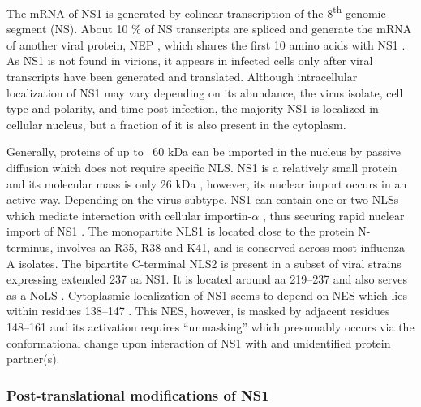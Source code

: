 		The mRNA of \gls{NS1} is generated by colinear transcription of the 8\textsuperscript{th} genomic segment (NS). About 10 \% of NS transcripts are spliced and generate the mRNA of another viral protein, \gls{NEP} \parencite{Lamb1980}, which shares the first 10 amino acids with \gls{NS1} \parencite{Inglis1979, Lamb1979, Lamb1980}. As \gls{NS1} is not found in virions, it appears in infected cells only after viral transcripts have been generated and translated. Although intracellular localization of \gls{NS1} may vary depending on its abundance, the virus isolate, cell type and polarity, and time post infection, the majority \gls{NS1} is localized in cellular nucleus, but a fraction of it is also present in the cytoplasm\parencite{Melen2007, Melen2012, Newby2007, Li1998, Greenspan1988}. 
		
		Generally, proteins of up to ~60 kDa can be imported in the nucleus by passive diffusion \parencite{Macara2001, Wang2007} which does not require specific \gls{NLS}. \gls{NS1} is a relatively small protein and its molecular mass is only 26 kDa \parencite{Ward1994}, however, its nuclear import occurs in an active way. Depending on the virus subtype, \gls{NS1} can contain one or two \glspl{NLS} which mediate interaction with cellular importin-$\alpha$ \parencite{Melen2007}, thus securing rapid nuclear import of \gls{NS1} \parencite{Privalsky1981}. The monopartite \gls{NLS}1 is located close to the protein N-terminus, involves aa R35, R38 and K41, and is conserved across most influenza A isolates. The bipartite C-terminal NLS2 is present in a subset of viral strains expressing extended 237 \gls{aa} \gls{NS1}. It is located around \gls{aa} 219--237 and also serves as a \gls{NoLS} \parencite{Melen2007, Melen2012}. Cytoplasmic localization of \gls{NS1} seems to depend on \gls{NES} which lies within residues 138--147 \parencite{Li1998}. This \gls{NES}, however, is masked by adjacent residues 148--161 and its activation requires ``unmasking'' which presumably occurs via the conformational change upon interaction of \gls{NS1} with and unidentified protein partner(s). 
		
		\subsubsection{Post-translational modifications of NS1}
		
		
